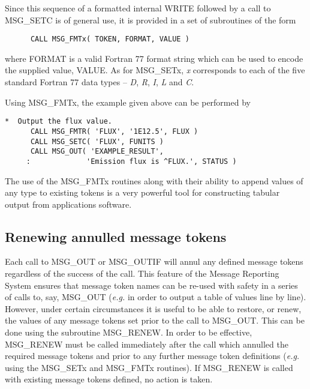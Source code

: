 Since this sequence of a formatted internal WRITE followed by a call to
MSG\_SETC is of general use, it is provided in a set of subroutines of the form

\begin {small}
\begin{verbatim}
      CALL MSG_FMTx( TOKEN, FORMAT, VALUE )
\end{verbatim}
\end {small}

where FORMAT is a valid Fortran 77 format string which can be used to
encode the supplied value, VALUE.
As for MSG\_SETx, {\em x} corresponds to each of the five standard Fortran 77 
data types -- {\em D}, {\em R}, {\em I}, {\em L} and {\em C}.

Using MSG\_FMTx, the example given above can be performed by

\begin {small}
\begin{verbatim}
*  Output the flux value.
      CALL MSG_FMTR( 'FLUX', '1E12.5', FLUX )
      CALL MSG_SETC( 'FLUX', FUNITS )
      CALL MSG_OUT( 'EXAMPLE_RESULT', 
     :             'Emission flux is ^FLUX.', STATUS )
\end{verbatim}
\end {small}

The use of the MSG\_FMTx routines along with their ability to append values
of any type to existing tokens is a very powerful tool for constructing 
tabular output from applications software.


\subsection {Renewing annulled message tokens}

Each call to MSG\_OUT or MSG\_OUTIF will annul any defined message tokens
regardless of the success of the call.
This feature of the Message Reporting System ensures that message token names
can be re-used with safety in a series of calls to, say, MSG\_OUT ({\em e.g.}
in order to output a table of values line by line).
However, under certain circumstances it is useful to be able to restore, or 
renew, the values of any message tokens set prior to the call to MSG\_OUT.
This can be done using the subroutine MSG\_RENEW.
In order to be effective, MSG\_RENEW must be called immediately after the call
which annulled the required message tokens and prior to any further message
token  definitions ({\em e.g.} using the MSG\_SETx and MSG\_FMTx routines).
If MSG\_RENEW is called with existing message tokens defined, no action is
taken.

